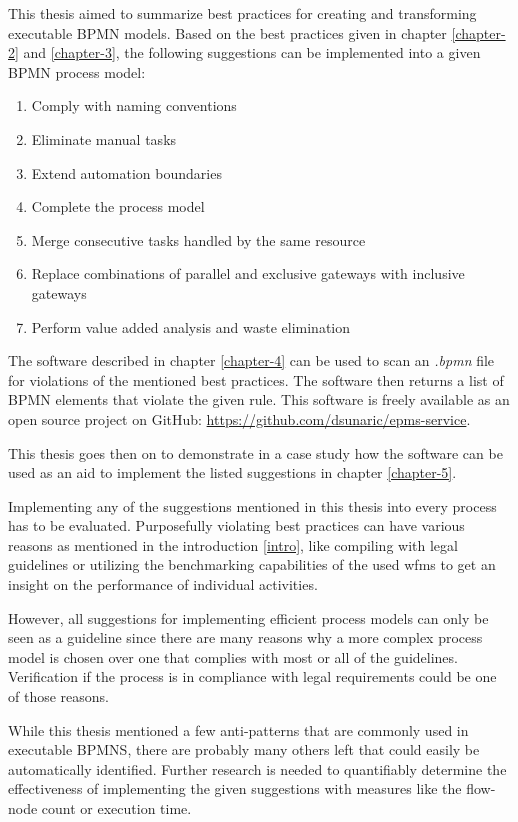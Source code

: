 This thesis aimed to summarize best practices for creating and transforming executable BPMN models. Based on the best practices given in chapter \ref{chapter-2} and \ref{chapter-3}, the following suggestions can be implemented into a given BPMN process model:
\begin{enumerate}
	\item Comply with naming conventions
	\item Eliminate manual tasks
	\item Extend automation boundaries
	\item Complete the process model
	\item Merge consecutive tasks handled by the same resource
	\item Replace combinations of parallel and exclusive gateways with inclusive gateways
	\item Perform value added analysis and waste elimination
\end{enumerate}

The software described in chapter \ref{chapter-4} can be used to scan an \textit{.bpmn} file for violations of the mentioned best practices. The software then returns a list of BPMN elements that violate the given rule. This software is freely available as an open source project on GitHub:  \url{https://github.com/dsunaric/epms-service}. 

This thesis goes then on to demonstrate in a case study how the software can be used as an aid to implement the listed suggestions in chapter \ref{chapter-5}. 

Implementing any of the suggestions mentioned in this thesis into every process has to be evaluated. Purposefully violating best practices can have various reasons as mentioned in the introduction \ref{intro}, like compiling with legal guidelines or utilizing the benchmarking capabilities of the used \gls{wfms} to get an insight on the performance of individual activities. 

However, all suggestions for implementing efficient process models can only be seen as a guideline since there are many reasons why a more complex process model is chosen over one that complies with most or all of the guidelines. Verification if the process is in compliance with legal requirements could be one of those reasons.

While this thesis mentioned a few anti-patterns that are commonly used in executable BPMNS, there are probably many others left that could easily be automatically identified. Further research is needed to quantifiably determine the effectiveness of implementing the given suggestions with measures like the flow-node count or execution time. 
